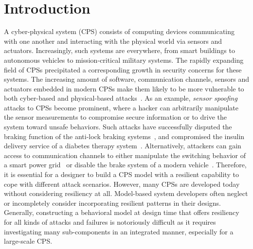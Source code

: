 \section{Introduction}
\label{sec:intro}
A cyber-physical system (CPS) consists of computing devices communicating with one another and interacting with the physical world via sensors and actuators. Increasingly, such systems are everywhere, from smart buildings to autonomous vehicles to mission-critical military systems. 
%
The rapidly expanding field of CPSs precipitated a corresponding growth in security concerns for these systems. The increasing amount of software, communication channels, sensors and actuators embedded in modern CPSs make them likely to be more vulnerable to both cyber-based and physical-based attacks~\cite{wan2015security, wasicek2014aspect, kocher2004security, al2015design, gamage2010enforcing}. As an example, \emph{sensor spoofing} attacks to CPSs become prominent, where a hacker can arbitrarily manipulate the sensor measurements to compromise secure information or to drive the system toward unsafe behaviors. Such attacks have successfully disputed the braking function of the anti-lock braking systems~\cite{Shoukry2013,al2015design}, and compromised the insulin delivery service of a diabetes therapy system~\cite{li2011hijacking}. Alternatively, attackers can gain access to communication channels to either manipulate the switching behavior of a smart power grid~\cite{liu2011class} or disable the brake system of a modern vehicle~\cite{koscher2010experimental}. 
%
Therefore, it is essential for a designer to build a CPS model with a resilient capability to cope with different attack scenarios. However, many CPSs are developed today without considering resiliency at all. Model-based system developers often neglect or incompletely consider incorporating resilient patterns in their designs. 
%
%
Generally, constructing a behavioral model at design time that offers resiliency for all kinds of attacks and failures is notoriously difficult as it requires investigating many sub-components in an integrated manner, especially for a large-scale CPS.
%

